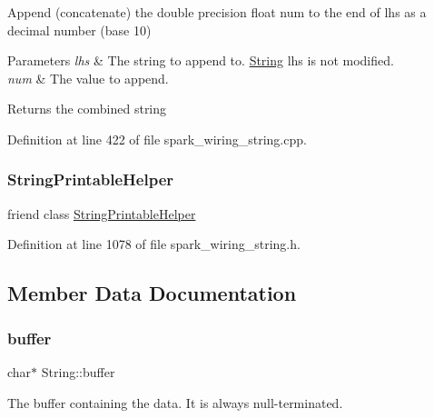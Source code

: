 Append (concatenate) the double precision float num to the end of lhs as a decimal number (base 10) 


\begin{DoxyParams}{Parameters}
{\em lhs} & The string to append to. \hyperlink{class_string}{String} lhs is not modified.\\
\hline
{\em num} & The value to append.\\
\hline
\end{DoxyParams}
\begin{DoxyReturn}{Returns}
the combined string 
\end{DoxyReturn}


Definition at line 422 of file spark\+\_\+wiring\+\_\+string.\+cpp.

\mbox{\label{class_string_a5e68bdc5e2e049ec2703293759e6049a}} 
\subsubsection{\texorpdfstring{String\+Printable\+Helper}{StringPrintableHelper}}
{\footnotesize\ttfamily friend class \hyperlink{class_string_printable_helper}{String\+Printable\+Helper}\hspace{0.3cm}{\ttfamily [friend]}}



Definition at line 1078 of file spark\+\_\+wiring\+\_\+string.\+h.



\subsection{Member Data Documentation}
\mbox{\label{class_string_a7892a52a08b6671add931f85a19c1d46}} 
\subsubsection{\texorpdfstring{buffer}{buffer}}
{\footnotesize\ttfamily char$\ast$ String\+::buffer\hspace{0.3cm}{\ttfamily [protected]}}



The buffer containing the data. It is always null-\/terminated. 



